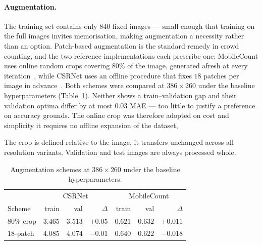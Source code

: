\documentclass[conference]{IEEEtran}
\begin{document}
\paragraph{Augmentation.}
The training set contains only $840$ fixed images — small enough that
training on the full images invites memorisation, making augmentation
a necessity rather than an option. Patch-based augmentation is the
standard remedy in crowd counting, and the two reference
implementations each prescribe one: MobileCount uses online random
crops covering $80\%$ of the image, generated afresh at every
iteration~\cite{wang2020mobilecount}, while CSRNet uses an offline
procedure that fixes $18$ patches per image in
advance~\cite{li2018csrnet}.
Both schemes were compared at $386\times260$ under the baseline
hyperparameters (Table~\ref{tab:aug_paper_schemes}). Neither shows a
train--validation gap and their validation optima differ by at most
$0.03$ MAE — too little to justify a preference on accuracy grounds. 
The online crop was therefore adopted on cost and simplicity %
it requires no offline expansion of the dataset, %


The crop is defined relative to the image, it
transfers unchanged across all resolution variants. Validation and test images are always processed whole. 

\begin{table}[t]
    \centering
    \caption{Augmentation schemes at $386\times260$ under the baseline
    hyperparameters. }
    \label{tab:aug_paper_schemes}
    \small
    \begin{tabular}{l rrrrrr}
        \toprule
        & \multicolumn{3}{c}{CSRNet}& \multicolumn{3}{c}{MobileCount}\\
        
        Scheme& train & val & $\Delta$ & train & val & $\Delta$ \\
        \midrule
        $80\%$ crop& $3.465$ & $3.513$ & $+0.05$ & $0.621$ & $0.632$ & $+0.011$ \\
        $18$-patch& $4.085$ & $4.074$ & $-0.01$ & $0.640$ & $0.622$ & $-0.018$ \\
        \bottomrule
    \end{tabular}
\end{table}
\end{document}
